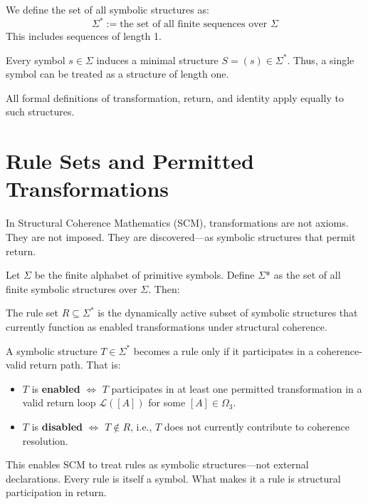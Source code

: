 We define the set of all symbolic structures as:
\begin{equation} \label{eq:all_symbolic_structures}
\Sigma^* := \text{the set of all finite sequences over } \Sigma
\end{equation}
This includes sequences of length 1.

Every symbol $s \in \Sigma$ induces a minimal structure $S = (s) \in \Sigma^*$.  
Thus, a single symbol can be treated as a structure of length one.

All formal definitions of transformation, return, and identity apply equally to such structures.

\section{Rule Sets and Permitted Transformations}

In Structural Coherence Mathematics (SCM), transformations are not axioms. They are not imposed. They are discovered---as symbolic structures that permit return.

Let $\Sigma$ be the finite alphabet of primitive symbols. Define $\Sigma$* as the set of all finite symbolic structures over $\Sigma$. Then:

\begin{definition} \label{def:rule-set-r}
The rule set $R \subseteq \Sigma^*$ is the dynamically active subset of symbolic structures that currently function as enabled transformations under structural coherence.
\end{definition}

\begin{definition} \label{def:enabled-vs-disabled-rules}
A symbolic structure $T \in \Sigma^*$ becomes a rule only if it participates in a coherence-valid return path. That is:
\begin{itemize}
  \item $T$ is \textbf{enabled} $\iff$ $T$ participates in at least one permitted transformation in a valid return loop $\mathcal{L}([A])$ for some $[A] \in \Omega_3$.
  \item $T$ is \textbf{disabled} $\iff$ $T \notin R$, i.e., $T$ does not currently contribute to coherence resolution.
\end{itemize}
\end{definition}

This enables SCM to treat rules as symbolic structures---not external declarations. Every rule is itself a symbol. What makes it a rule is structural participation in return.

